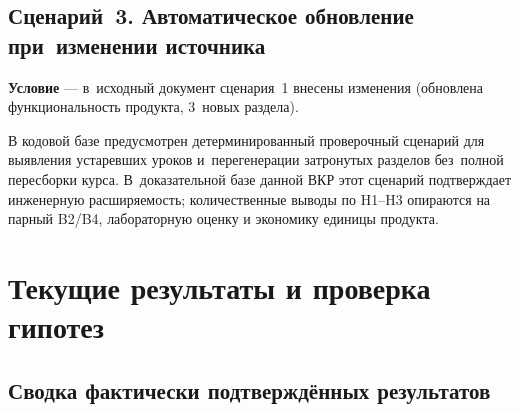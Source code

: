 \subsection[Сценарий 3. Автоматическое обновление]{Сценарий~3. Автоматическое обновление при~изменении источника}

\textbf{Условие} — в~исходный документ сценария~1 внесены изменения
(обновлена функциональность продукта, 3~новых раздела).

В кодовой базе предусмотрен детерминированный проверочный сценарий для
выявления устаревших уроков и~перегенерации затронутых разделов
без~полной пересборки курса. В~доказательной базе данной ВКР этот
сценарий подтверждает инженерную расширяемость; количественные выводы
по H1–H3 опираются на парный B2/B4, лабораторную оценку и экономику
единицы продукта.

\section{Текущие результаты и проверка гипотез}

\subsection{Сводка фактически подтверждённых результатов}

